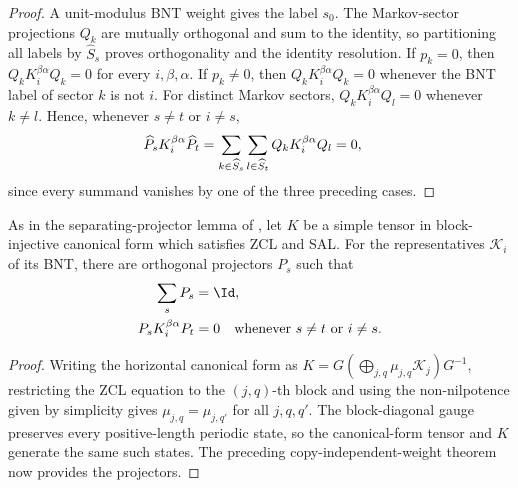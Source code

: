 \begin{proof}
    \leanok
    A unit-modulus BNT weight gives the label $s_0$. The Markov-sector
    projections $Q_k$ are mutually orthogonal and sum to the identity, so
    partitioning all labels by $\widehat S_s$ proves orthogonality and the
    identity resolution. If $p_k=0$, then
    $Q_kK_i^{\beta\alpha}Q_k=0$ for every $i,\beta,\alpha$. If $p_k\ne0$, then
    $Q_kK_i^{\beta\alpha}Q_k=0$ whenever the BNT label of sector $k$ is not
    $i$. For distinct Markov sectors,
    $Q_kK_i^{\beta\alpha}Q_l=0$ whenever $k\ne l$. Hence, whenever $s\ne t$
    or $i\ne s$,
    \begin{align}
        \widehat P_sK_i^{\beta\alpha}\widehat P_t
         & =\sum_{k\in\widehat S_s}\sum_{l\in\widehat S_t}
        Q_kK_i^{\beta\alpha}Q_l
        =0,
        \notag
    \end{align}
    since every summand vanishes by one of the three preceding cases.
\end{proof}

\begin{lemma}
    \label{thm:mpdo_sal_bnt_separating_projectors}
    \leanok
    As in the separating-projector lemma of
    \cite[Appendix~C.2, lines~1626--1691]{Cirac2016MPDO_arXiv}, let $K$ be a
    simple tensor in block-injective canonical form which satisfies ZCL and
    SAL. For the representatives $\mathcal K_i$ of its BNT, there are
    orthogonal projectors $P_s$ such that
    \begin{align}
        \sum_sP_s               & =\Id,
        \notag                          \\
        P_sK_i^{\beta\alpha}P_t & =0
        \quad\text{whenever }s\ne t\text{ or }i\ne s.
        \notag
    \end{align}
\end{lemma}

\begin{proof}
    \leanok
    Writing the horizontal canonical form as
    $K=G(\bigoplus_{j,q}\mu_{j,q}\mathcal K_j)G^{-1}$, restricting the ZCL
    equation to the $(j,q)$-th block and using the non-nilpotence given by
    simplicity gives $\mu_{j,q}=\mu_{j,q'}$ for all $j,q,q'$.
    The block-diagonal gauge preserves every positive-length periodic state,
    so the canonical-form tensor and $K$ generate the same such states. The
    preceding copy-independent-weight theorem now provides the projectors.
\end{proof}

